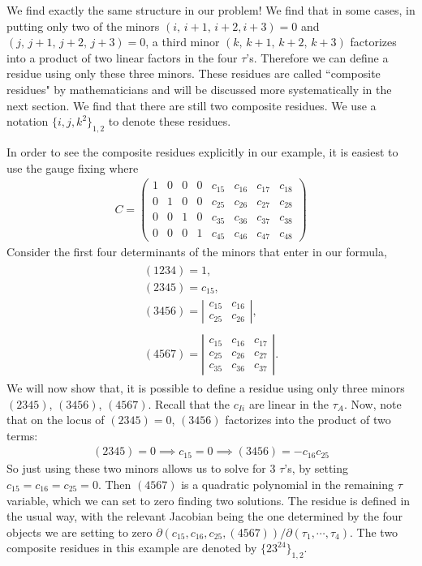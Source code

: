 \documentclass[12pt]{article}
\newcommand{\be}{\begin{eqnarray}}
\newcommand{\ee}{\end{eqnarray}}
\begin{document}
We find exactly the same structure in our problem! We find that in some cases, in putting only two of the minors $(i, \, i+1, \, i+2, i+3) = 0$ and $(j, \, j+1, \, j+2, \, j+3)=0$, a third minor $(k, \, k+1, \, k+2, \, k+3)$ factorizes into a product of two linear factors in the four $\tau$'s.  Therefore we can define a residue using only these three minors. These residues are called ``composite residues" by mathematicians and will be discussed more systematically in the next section. We find that there are still two composite residues. We use a notation $\{i, j, k^2\}_{1,2}$ to denote these residues.

In order to see the composite residues explicitly in our example, it is easiest to use the gauge fixing where
\be
C = \left(\begin{array}{cccccccc} 1 & 0  & 0 & 0 & c_{15} & c_{16} & c_{17} & c_{18} \\ 0 & 1 & 0 & 0 & c_{25} & c_{26} & c_{27} & c_{28} \\ 0 & 0 &  1 & 0 & c_{35} & c_{36}  & c_{37} & c_{38} \\ 0 & 0 & 0 & 1 & c_{45} & c_{46} & c_{47} & c_{48} \end{array} \right)
\ee
%
Consider the first four determinants of the minors that enter in our formula,
%
%
\be
\label{nino}
\begin{array}{l}
(1234) = 1, \\
(2345) = c_{15}, \\
(3456) = \left| \begin{array}{cc} c_{15} & c_{16} \\ c_{25} & c_{26} \end{array} \right|, \\ \\
(4567) = \left| \begin{array}{ccc} c_{15} & c_{16} & c_{17} \\ c_{25} & c_{26} & c_{27} \\ c_{35} & c_{36} & c_{37} \end{array} \right|.
\end{array}
\ee
%
We will now show that, it is possible to define a residue using only three minors $(2345)$, $(3456)$, $(4567)$. Recall that the $c_{Ii}$ are linear in the $\tau_A$. Now, note that on the locus of $(2345) = 0$, $(3456)$ factorizes into the product of two terms:
\be
(2345) = 0 \implies c_{15} = 0 \implies (3456) = -c_{16} c_{25}
\ee
So just using these two minors allows us to solve for 3 $\tau$'s, by setting $c_{15} = c_{16} = c_{25} = 0$. Then $(4567)$ is a quadratic
polynomial in the remaining $\tau$ variable, which we can set to zero finding two solutions. The residue is defined in the usual way, with the relevant Jacobian being the one determined by the four objects we are setting to zero $\partial(c_{15},c_{16},c_{25},(4567))/\partial(\tau_1,\cdots,\tau_4)$.
The two composite residues in this example are denoted by $\{23^24\}_{1,2}$.
\end{document}
